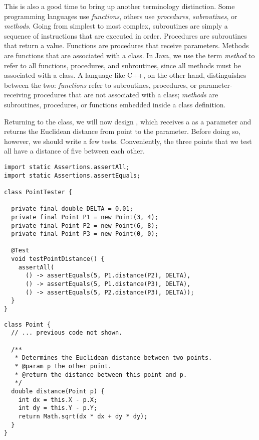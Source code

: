 This is also a good time to bring up another terminology distinction. 
Some programming languages use \emph{functions}, others use \emph{procedures}, \emph{subroutines}, or \emph{methods}. 
Going from simplest to most complex, subroutines are simply a sequence of instructions that are executed in order. 
Procedures are subroutines that return a value. 
Functions are procedures that receive parameters. 
Methods are functions that are associated with a class. 
In Java, we use the term \emph{method} to refer to all functions, procedures, and subroutines, since all methods must be associated with a class. 
A language like C++, on the other hand, distinguishes between the two: \emph{functions} refer to subroutines, procedures, or parameter-receiving procedures that are not associated with a class; \emph{methods} are subroutines, procedures, or functions embedded inside a class definition.

Returning to the  class, we will now design , which receives a  as a parameter and returns the Euclidean distance from  point to the parameter. 
Before doing so, however, we should write a few tests. 
Conveniently, the three points that we test all have a distance of five between each other.

\begin{lstlisting}[language=MyJava]
import static Assertions.assertAll;
import static Assertions.assertEquals;

class PointTester {

  private final double DELTA = 0.01;
  private final Point P1 = new Point(3, 4);
  private final Point P2 = new Point(6, 8);
  private final Point P3 = new Point(0, 0);

  @Test
  void testPointDistance() {
    assertAll(
      () -> assertEquals(5, P1.distance(P2), DELTA),
      () -> assertEquals(5, P1.distance(P3), DELTA),
      () -> assertEquals(5, P2.distance(P3), DELTA));
  }
}
\end{lstlisting}

\enlargethispage{-6\baselineskip}
\begin{lstlisting}[language=MyJava]
class Point {
  // ... previous code not shown.

  /**
   * Determines the Euclidean distance between two points.
   * @param p the other point.
   * @return the distance between this point and p.
   */
  double distance(Point p) {
    int dx = this.X - p.X;
    int dy = this.Y - p.Y;
    return Math.sqrt(dx * dx + dy * dy);
  }
}
\end{lstlisting}

